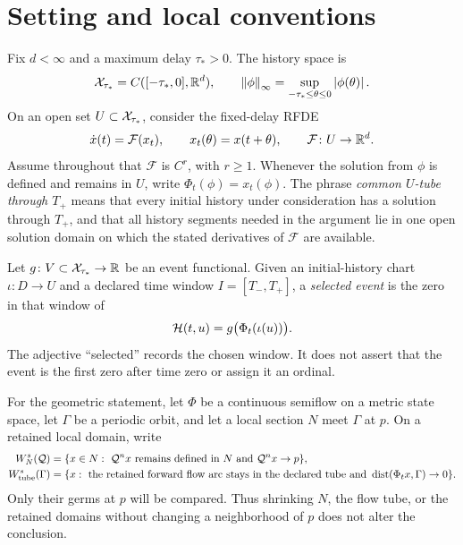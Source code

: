 \section{Setting and local conventions}\label{sec:setting}

Fix \(d<\infty\) and a maximum delay \(\tau_*>0\).  The history space is
\begin{equation}
 \mathcal X_{\tau_*}=C([-\tau_*,0],\mathbb R^d),\qquad
 \left\lVert\phi\right\rVert_{\infty}=\sup_{-\tau_*\le\theta\le0}\left\lvert\phi(\theta)\right\rvert.
 \label{eq:history-space}
\end{equation}
On an open set \(U\subset\mathcal X_{\tau_*}\), consider the fixed-delay RFDE
\begin{equation}
 \dot x(t)=\mathcal F(x_t),
 \qquad x_t(\theta)=x(t+\theta),
 \qquad \mathcal F\colon U\to\mathbb R^d.                 \label{eq:general-rfde}
\end{equation}
Assume throughout that \(\mathcal F\) is \(C^r\), with \(r\ge 1\).
Whenever the solution from \(\phi\) is defined and remains in \(U\), write
\(
 \Phi_t(\phi)=x_t(\phi).
\)
The phrase \emph{common \(U\)-tube through \(T_+\)} means that every initial
history under consideration has a solution through \(T_+\), and that all
history segments needed in the argument lie in one open solution domain on
which the stated derivatives of \(\mathcal F\) are available.

\begin{definition}
Let \(g\colon V\subset\mathcal X_{\tau_*}\to\mathbb R\) be an event functional.  Given an
initial-history chart \(\iota\colon D\to U\) and a declared time window
\(I=[T_-,T_+]\), a \emph{selected event} is the zero in that window of
\begin{equation}
 \mathcal H(t,u)=g\bigl(\Phi_t(\iota(u))\bigr).             \label{eq:event-functional}
\end{equation}
The adjective ``selected'' records the chosen window.  It does not assert
that the event is the first zero after time zero or assign it an ordinal.
\end{definition}

For the geometric statement, let \(\Phi\) be a continuous semiflow on a
metric state space, let \(\Gamma\) be a periodic orbit, and let a local
section \(N\) meet \(\Gamma\) at \(p\).  On a retained local domain, write
\begin{align*}
 W_N^s(\mathcal Q)
   &=\{x\in N:\ \mathcal Q^n x\text{ remains defined in }N
                 \text{ and }\mathcal Q^n x\to p\},\\
 W^s_{\mathrm{tube}}(\Gamma)
   &=\{x:\ \text{the retained forward flow arc stays in the declared tube}
             \text{ and }\operatorname{dist}(\Phi_t x,\Gamma)\to0\}.
\end{align*}
Only their germs at \(p\) will be compared.  Thus shrinking \(N\), the flow
tube, or the retained domains without changing a neighborhood of \(p\) does
not alter the conclusion.
